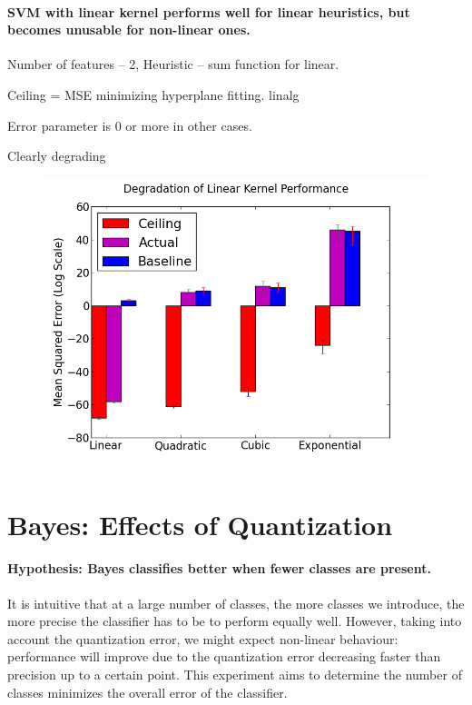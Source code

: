\documentclass[12pt,notitlepage,twoside]{scrreprt}
\begin{document}
\paragraph{SVM with linear kernel performs well for linear heuristics, but becomes
unusable for non-linear ones.}

Number of features -- 2, Heuristic -- sum function for linear.

Ceiling = MSE minimizing hyperplane fitting. linalg

Error parameter is 0 or more in other cases.

Clearly degrading

\begin{figure}[h!]
\centering
  \includegraphics[width=\linewidth]{figs/lin_degrad.png}
  \caption{}
  \label{lin_degrad}
\end{figure}


\section{Bayes: Effects of Quantization}
\paragraph{Hypothesis: Bayes classifies better when fewer classes are present.}
It is intuitive that at a large number of classes, the more classes we introduce, the more precise the classifier has to be to perform
equally well. However, taking into account the quantization error, we might expect
non-linear behaviour: performance will improve due to the quantization error decreasing
faster than precision up to a certain point. This experiment aims to determine the number
of classes minimizes the overall error of the classifier.
\end{document}

